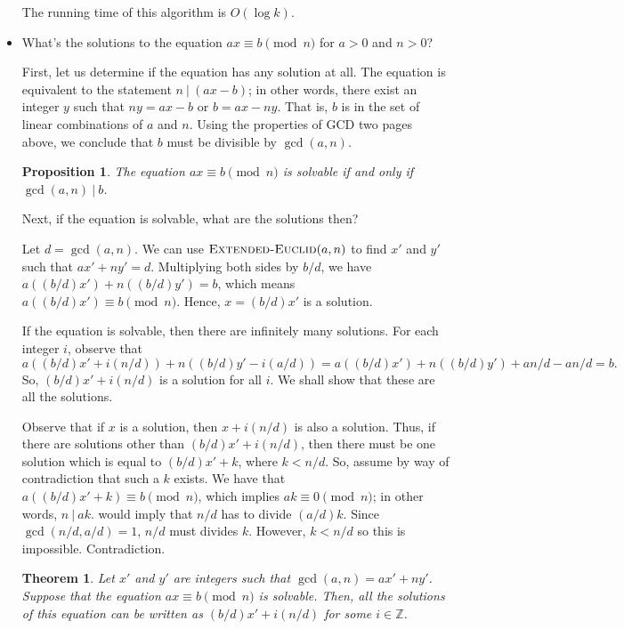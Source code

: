 \documentclass{article}
\newtheorem{theorem}[lemma]{Theorem}
\newtheorem{proposition}[lemma]{Proposition}
\newcommand{\divides}{\ |\ }
\begin{document}
\begin{itemize}
The running time of this algorithm is $O(\log k)$.

\item What's the solutions to the equation $ax \equiv b \pmod n$ for $a > 0$ and $n > 0$?

First, let us determine if the equation has any solution at all. The equation is equivalent to the statement $n \divides (ax - b)$; in other words, there exist an integer $y$ such that $ny = ax - b$ or $b = ax - ny$. That is, $b$ is in the set of linear combinations of $a$ and $n$. Using the properties of GCD two pages above, we conclude that $b$ must be divisible by $\gcd(a,n)$.

\begin{proposition}
The equation $ax \equiv b \pmod n$ is solvable if and only if $\gcd(a,n) \divides b$.
\end{proposition}

Next, if the equation is solvable, what are the solutions then?

Let $d = \gcd(a,n)$. We can use $\textnormal{\scshape Extended-Euclid}(a,n)$ to find $x'$ and $y'$ such that $ax' + ny' = d$. Multiplying both sides by $b/d$, we have $a((b/d)x') + n((b/d)y') = b$, which means $a((b/d)x') \equiv b \pmod n$. Hence, $x = (b/d)x'$ is a solution.

If the equation is solvable, then there are infinitely many solutions. For each integer $i$, observe that $$a((b/d)x' + i(n/d)) + n((b/d)y' - i(a/d)) = a((b/d)x') + n((b/d)y') + an/d - an/d = b.$$ So, $(b/d)x' + i(n/d)$ is a solution for all $i$. We shall show that these are all the solutions.

Observe that if $x$ is a solution, then $x + i(n/d)$ is also a solution. Thus, if there are solutions other than $(b/d)x' + i(n/d)$, then there must be one solution which is equal to $(b/d)x' + k$, where $k < n/d$. So, assume by way of contradiction that such a $k$ exists. We have that $a((b/d)x' + k) \equiv b \pmod n$, which implies $ak \equiv 0 \pmod n$; in other words, $n \divides ak$.  would imply that $n/d$ has to divide $(a/d)k$. Since $\gcd(n/d, a/d) = 1$, $n/d$ must divides $k$. However, $k < n/d$ so this is impossible. Contradiction.

\begin{theorem}
Let $x'$ and $y'$ are integers such that $\gcd(a,n) = ax' + ny'$. Suppose that the equation $ax \equiv b \pmod n$ is solvable. Then, all the solutions of this equation can be written as $(b/d)x' + i(n/d)$ for some $i \in \mathbb{Z}$.
\end{theorem}


\end{itemize}
\end{document}

